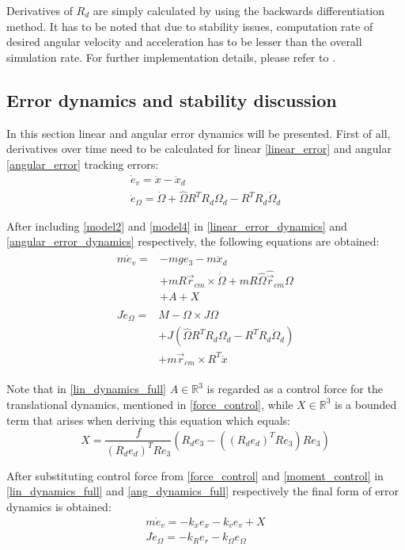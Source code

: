 Derivatives of $R_d$ are simply calculated by using the backwards differentiation method. It has to be noted that due to stability issues, computation rate of desired angular velocity and acceleration has to be lesser than the overall simulation rate. For further implementation details, please refer to \cite{gitLink}.

\subsection{Error dynamics and stability discussion}

In this section linear and angular error dynamics will be presented. First of all, derivatives over time need to be calculated for linear \ref{linear_error} and angular \ref{angular_error} tracking errors:
\begin{gather}
	\dot{e}_v = \ddot{x} - \ddot{x}_d \label{linear_error_dynamics}\\
	\dot{e}_\Omega = \dot{\Omega} + \hat{\Omega}R^TR_d\Omega_d - R^TR_d\dot{\Omega}_d \label{angular_error_dynamics}
\end{gather}

\noindent After including \ref{model2} and \ref{model4} in \ref{linear_error_dynamics} and \ref{angular_error_dynamics} respectively, the following equations are obtained:
\begin{align}
	\label{lin_dynamics_full}
	\begin{split}
		m\dot{e}_v = & - mge_3 - m\ddot{x}_d \\
			&+ mR\vec{r}_{cm}  \times \dot{\Omega} + mR\hat{\Omega}\hat{\vec{r}}_{cm}\Omega \\
			&+ A + X	
	\end{split} \\
	\label{ang_dynamics_full}
	\begin{split}
		J\dot{e}_\Omega = &M - \Omega \times J\Omega \\
			&+ J(\hat{\Omega}R^TR_d\Omega_d - R^TR_d\dot{\Omega}_d) \\
			&+ m\vec{r}_{cm} \times R^T \ddot{x}
	\end{split}
\end{align}

Note that in \ref{lin_dynamics_full} $A\in \mathbb{R}^3$ is regarded as a control force for the translational dynamics, mentioned in \ref{force_control}, while $X\in\mathbb{R}^3$ is a bounded term that arises when deriving this equation which equals:
\begin{equation}
	X = \frac{f}{(R_de_d)^TRe_3}(R_d e_3 - ((R_de_d)^TRe_3)Re_3)
\end{equation}

After substituting control force from \ref{force_control} and \ref{moment_control} in \ref{lin_dynamics_full} and \ref{ang_dynamics_full} respectively the final form of error dynamics is obtained:
\begin{gather}
	m\dot{e}_v = -k_x e_x - k_v e_v + X \\
	J\dot{e}_\Omega = -k_R e_r - k_\Omega e_\Omega
\end{gather}



